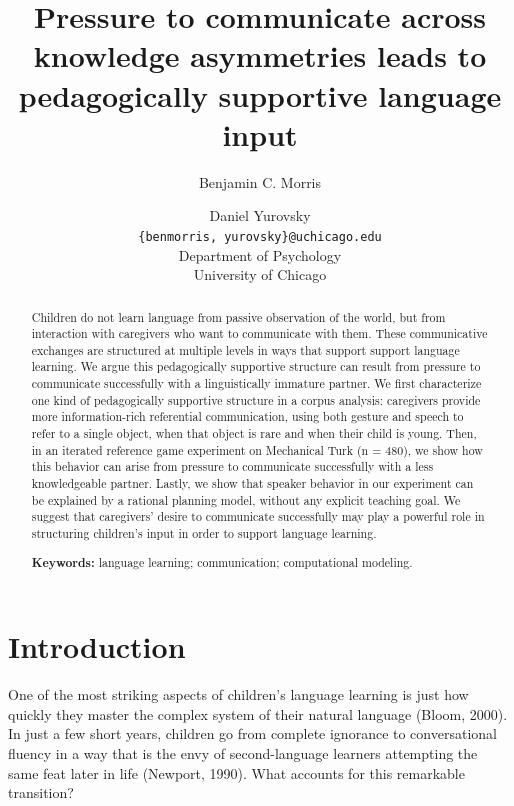 \documentclass[10pt, letterpaper]{article}
\title{Pressure to communicate across knowledge asymmetries leads to
pedagogically supportive language input}
\author{Benjamin C. Morris \and Daniel Yurovsky \\
        \texttt{\{benmorris, yurovsky\}@uchicago.edu} \\
       Department of Psychology \\ University of Chicago}
\begin{document}
\maketitle

\begin{abstract}
Children do not learn language from passive observation of the world,
but from interaction with caregivers who want to communicate with them.
These communicative exchanges are structured at multiple levels in ways
that support support language learning. We argue this pedagogically
supportive structure can result from pressure to communicate
successfully with a linguistically immature partner. We first
characterize one kind of pedagogically supportive structure in a corpus
analysis: caregivers provide more information-rich referential
communication, using both gesture and speech to refer to a single
object, when that object is rare and when their child is young. Then, in
an iterated reference game experiment on Mechanical Turk (n = 480), we
show how this behavior can arise from pressure to communicate
successfully with a less knowledgeable partner. Lastly, we show that
speaker behavior in our experiment can be explained by a rational
planning model, without any explicit teaching goal. We suggest that
caregivers' desire to communicate successfully may play a powerful role
in structuring children's input in order to support language learning.

\textbf{Keywords:}
language learning; communication; computational modeling.
\end{abstract}

\section{Introduction}\label{introduction}

One of the most striking aspects of children's language learning is just
how quickly they master the complex system of their natural language
(Bloom, 2000). In just a few short years, children go from complete
ignorance to conversational fluency in a way that is the envy of
second-language learners attempting the same feat later in life
(Newport, 1990). What accounts for this remarkable transition?
\end{document}
